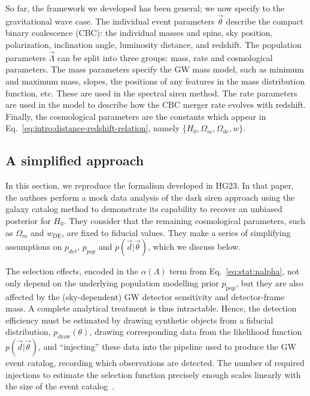 \documentclass[%
preprint,
nofootinbib,
 amsmath,amssymb,
 aps,
]{revtex4-2}
\newcommand{\given}[2]{p( #1 | #2 )}
\newcommand{\ppop}[0]{p_{\text{pop}}}
\begin{document}
So far, the framework we developed has been general; we now specify to the gravitational wave case.
The individual event parameters $\vec{\theta}$ describe the compact binary coalescence (CBC): the
individual masses and spins, sky position, polarization, inclination angle, luminosity distance,
and redshift. The population parameters $\vec{\Lambda}$ can be split into three groups: mass, rate
and cosmological parameters. The mass parameters specify the GW mass model, such as minimum and
maximum mass, slopes, the positions of any features in the mass distribution function, etc. These
are used in the spectral siren method. The rate parameters are used in the model to describe how
the CBC merger rate evolves with redshift. Finally, the cosmological parameters are the constants
which appear in Eq.~\eqref{eq:intro:distance-redshift-relation}, namely $\{H_0, \Omega_m,
	\Omega_{de}, w\}$.

\subsection{A simplified approach}
\label{sec:stat:simplified}

In this section, we reproduce the formalism developed in HG23. In that paper, the authors perform a
mock data analysis of the dark siren approach using the galaxy catalog method to demonstrate its
capability to recover an unbiased posterior for $H_0$. They consider that the remaining
cosmological parameters, such as $\Omega_m$ and $w_\text{DE}$, are fixed to fiducial values. They
make a series of simplifying assumptions on $p_{det}$, $p_{pop}$ and
$\given{\vec{d}}{\vec{\theta}}$, which we discuss below.

The selection effects, encoded in the $\alpha (\Lambda )$ term from Eq.~\eqref{eq:stat:nalpha}, not
only depend on the underlying population modelling prior $\ppop$, but they are also affected by the
(sky-dependent) GW detector sensitivity and detector-frame mass. A complete analytical treatment is
thus intractable. Hence, the detection efficiency must be estimated by drawing synthetic objects
from a fiducial distribution, $p_\text{draw}(\theta)$, drawing corresponding data from the
likelihood function $\given{\vec{d}}{\vec{\theta}}$, and “injecting” these data into the pipeline
used to produce the GW event catalog, recording which observations are detected. The number of
required injections to estimate the selection function precisely enough scales linearly with the
size of the event catalog~\cite{essick2022precision}.
\end{document}
